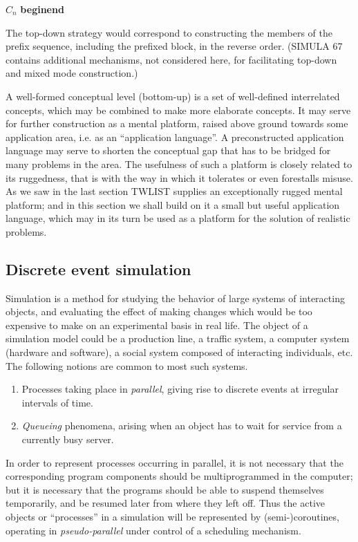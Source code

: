 \quad $C_n$ \textbf{begin}\textemdash{}\textbf{end}

\noindent
The top-down strategy would correspond to constructing the members of the prefix sequence, including the prefixed block, in the reverse order. (SIMULA 67 contains additional mechanisms, not considered here, for facilitating top-down and mixed mode construction.)

A well-formed conceptual level (bottom-up) is a set of well-defined interrelated concepts, which may be combined to make more elaborate concepts. It may serve for further construction as a mental platform, raised above ground towards some application area, i.e. as an ``application language''. A preconstructed application language may serve to shorten the conceptual gap that has to be bridged for many problems in the area. The usefulness of such a platform is closely related to its ruggedness, that is with the way in which it tolerates or even forestalls misuse. As we saw in the last section TWLIST supplies an exceptionally rugged mental platform; and in this section we shall build on it a small but useful application language, which may in its turn be used as a platform for the solution of realistic problems.

\subsection{Discrete event simulation}

Simulation is a method for studying the behavior of large systems of interacting objects, and evaluating the effect of making changes which would be too expensive to make on an experimental basis in real life. The object of a simulation model could be a production line, a traffic system, a computer system (hardware and software), a social system composed of interacting individuals, etc. The following notions are common to most such systems.

\begin{enumerate}[wide, nosep, label=(\arabic*)]
	\item Processes taking place in \textit{parallel}, giving rise to discrete events at irregular intervals of time.
	\item \textit{Queueing} phenomena, arising when an object has to wait for service from a currently busy server.
\end{enumerate}

In order to represent processes occurring in parallel, it is not necessary that the corresponding program components should be multiprogrammed in the computer; but it is necessary that the programs should be able to suspend themselves temporarily, and be resumed later from where they left off. Thus the active objects or ``processes'' in a simulation will be represented by (semi-)coroutines, operating in \textit{pseudo-parallel} under control of a scheduling mechanism.

